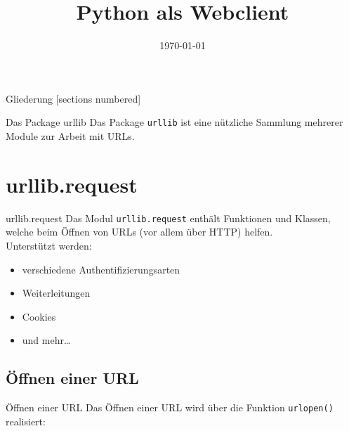 



\title{Python als Webclient}
\date{\today}




\maketitle

\begin{frame}{Gliederung}
	[sections numbered]
	\tableofcontents
\end{frame}


\begin{frame}[fragile]{Das Package urllib}
	Das Package \texttt{urllib} ist eine nützliche Sammlung mehrerer Module
	zur Arbeit mit URLs.
\end{frame}


\section{urllib.request}
\begin{frame}[fragile]{urllib.request}
	Das Modul \alert{\texttt{urllib.request}} enthält Funktionen und Klassen, welche
	beim Öffnen von URLs (vor allem über HTTP) helfen. \\[.5cm]
	Unterstützt werden:
	\begin{itemize}
		\item verschiedene Authentifizierungsarten
		\item Weiterleitungen
		\item Cookies
		\item und mehr\ldots
	\end{itemize}
\end{frame}

\subsection{Öffnen einer URL}
\begin{frame}[fragile]{Öffnen einer URL}
	Das Öffnen einer URL wird über die Funktion \alert{\texttt{urlopen()}} realisiert:
	
\end{frame}

